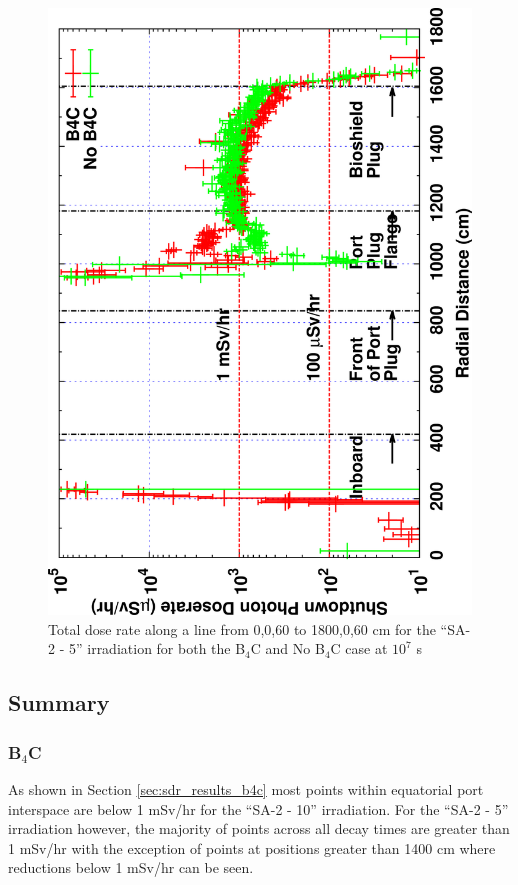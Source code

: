 \documentclass[12pt]{article}
\begin{document}
\begin{figure}[ht!]
\centering
\includegraphics[clip,scale=0.12,angle=-90]{../plots/photon_lineout/comp/10yr_dc3.png}
\caption{Total dose rate along a line from 0,0,60 to 1800,0,60 cm for the ``SA-2 - 5'' irradiation
for both the B$_4$C and No B$_4$C case at $10^7$ s}
\label{fig:photons_10y_dc3_dose}
\end{figure}
\clearpage
\newpage
\subsection{Summary}
\subsubsection*{B$_4$C}
As shown in Section \ref{sec:sdr_results_b4c} most points within equatorial port
interspace are below 1 mSv/hr for the ``SA-2 - 10'' irradiation. For the ``SA-2 - 5''
irradiation however, the majority of points across all decay times are
greater than 1 mSv/hr with the exception of points at positions greater than
1400 cm where reductions below 1 mSv/hr can be seen.
\end{document}
